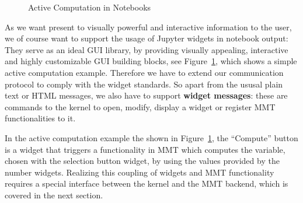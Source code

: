\begin{figure}[ht]\centering
  \caption{Active Computation in Notebooks}\label{fig:active-computation}
\end{figure}

As we want present to visually powerful and interactive information to the user, we of course want to support the usage of Jupyter widgets in notebook output:
They serve as an ideal GUI library, by providing visually appealing, interactive and highly customizable GUI building blocks, see Figure~\ref{fig:active-computation}, which shows a simple active computation example.
Therefore we have to extend our communication protocol to comply with the widget standards. So apart from the ususal plain text or HTML messages, we also have to support \textbf{widget messages}: these are commands to the kernel to open, modify, display a widget or register MMT functionalities to it.

In the active computation example the shown in Figure~\ref{fig:active-computation}, the ``Compute'' button is a widget that triggers a functionality in MMT which computes the variable, chosen with the selection button widget, by using the values provided by the number widgets. Realizing this coupling of widgets and MMT functionality requires a special interface between the kernel and the MMT backend, which is covered in the next section.




